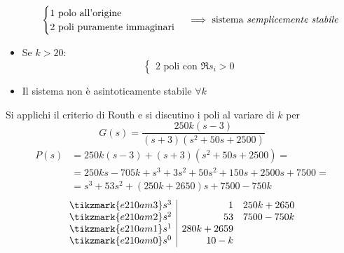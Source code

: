 \begin{itemize}
\begin{tikzpicture}[overlay, remember picture, yshift=.25\baselineskip, shorten >=.5pt, shorten <=.5pt]
		\end{tikzpicture}
		\[\begin{cases}
			1 \text{ polo all'origine} 		\\
			2 \text{ poli puramente immaginari}
		\end{cases} \implies \text{sistema \emph{semplicemente stabile}}\]
	\item Se \(k > 20\):
		\[\begin{cases}
			2 \text{ poli con } \Re s_i > 0
		\end{cases}\]
	\item Il sistema non è asintoticamente stabile \(\forall k\)
\end{itemize}

 Si applichi il criterio di Routh e si discutino i poli al variare di \(k\) per
\[
	G(s) = \frac{250k (s-3)}{(s+3)(s^2 +50s +2500)}
\]
\begin{align*}
	P(s) &= 250k (s-3) + (s+3)(s^2 +50s +2500) = 		   \\
	     &= 250ks -705k +s^3 +3s^2 +50s^2 +150s +2500s +7500 = \\
	     &= s^3 +53s^2 +(250k +2650)s +7500 -750k
\end{align*}
\[\begin{array}{r|rr}
	\tikzmark{e210am3} s^3 & 1 & 250k +2650 \\
	\tikzmark{e210am2} s^2 & 53 & 7500 -750k \\
	\tikzmark{e210am1} s^1 & 280k +2659 \\
	\tikzmark{e210am0} s^0 & 10-k
\end{array}\]
